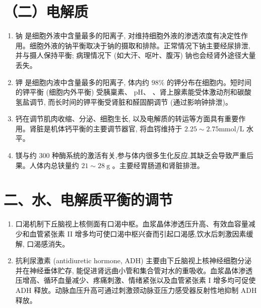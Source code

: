\documentclass[10pt]{article}
\begin{document}
\section*{（二）电解质}
\begin{enumerate}
  \item 钠 是细胞外液中含量最多的阳离子, 对维持细胞外液的渗透浓度有决定性作用。细胞外液的钠平衡取决于钠的摄取和排除。正常情况下钠主要经尿排泄, 并与摄人保持平衡; 病理情况下 (如大汗、呕叶、腹泻) 钠也会经肾外途径大量丢失。

  \item 钾 是细胞内液中含量最多的阳离子, 体内约 $98 \%$ 的钾分布在细胞内。短时间的钾平衡 (细胞内外平衡) 受胰稟素、 $\mathrm{pH} 、$ 、肾上腺素能受体激动剂和碳酸氢盐调节, 而长时间的钾平衡受肾脏和醛固酮调节 (通过影响钟排泄)。

  \item 钙在调节肌肉收缩、分泌、细胞生长, 以及电解质的转运等方面具有重要作用。肾脏是机体钙平衡的主要调节器官, 将血䥾维持于 $2.25 \sim 2.75 \mathrm{mmol} / \mathrm{L}$ 水平。

  \item 镁与约 300 种酶系统的激活有关,参与体内很多生化反应,其缺乏会导致严重后果。人体内总铗量约 $21 \sim 28 \mathrm{~g}$ 。主要经胃肠道和肾脏排泄。

\end{enumerate}

\section*{二、水、电解质平衡的调节}
\begin{enumerate}
  \item 口渴机制下丘脑视上核侧面有口渴中枢。血浆晶体渗透压升高、有效血容量减少和血管紧张素 II 增多均可使口渴中枢兴奋而引起口渴感,饮水后刺激因素缓解, 口渴感消失。

  \item 抗利尿激素 (antidiuretic hormone, ADH) 主要由下丘脑视上核神经细胞分泌并在神经垂体贮存, 能促进肾远曲小管和集合管对水的重吸收。血浆晶体渗透压增高、循环血量减少、疼痛刺激、情绪紧张以及血管紧张素 I 增多均可促使 ADH 释放。动脉血压升高可通过刺激颈动脉亚压力感受器反射性地抑制 ADH 释放。

\end{enumerate}
\end{document}
